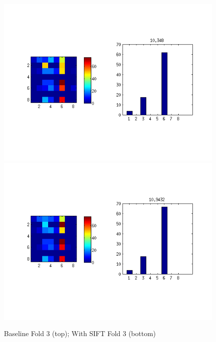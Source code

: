 \documentclass[10pt,twocolumn,letterpaper]{article}
\begin{document}
\begin{figure}[p]
 \centering
 \includegraphics[scale=0.5]{../../../evaluation/baseline/fold3_1e5.png}
 \includegraphics[scale=0.5]{../../../evaluation/feature-sift/fold3_1e5.png}
 \caption{Baseline Fold 3 (top); With SIFT Fold 3 (bottom)}
 \label{figure:withSiftFold3}
\end{figure}
\end{document}
